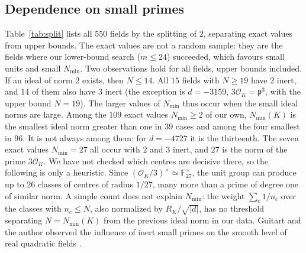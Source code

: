 \documentclass[11pt]{amsart}
\theoremstyle{definition}
\theoremstyle{remark}
\numberwithin{equation}{section}
\newcommand{\cO}{\mathcal{O}}
\newcommand{\Nmin}{N_{\min}}
\begin{document}
\subsection{Dependence on small primes}
Table~\ref{tab:split} lists all $550$ fields by the splitting of $2$, separating exact values
from upper bounds. The exact values are not a random sample: they are the fields where our
lower-bound search ($m\le24$) succeeded, which favours small units and small $\Nmin$. Two
observations hold for all fields, upper bounds included. If an ideal of norm $2$ exists, then
$N\le14$. All $15$ fields with $N\ge19$ have $2$ inert, and $14$ of them also have $3$ inert
(the exception is $d=-3159$, $3\cO_K=\mathfrak p^3$, with the upper bound $N=19$). The
larger values of $\Nmin$ thus occur when the small ideal norms are large. Among the $109$ exact
values $\Nmin\ge2$ of our own, $\Nmin(K)$ is the smallest ideal norm greater than one in $39$
cases and among the four smallest in $96$. It is not always among them: for $d=-4727$ it is the
thirteenth. The seven exact values $\Nmin=27$ all occur with $2$ and $3$ inert, and $27$ is the
norm of the prime $3\cO_K$. We have not checked which centres are decisive there, so the
following is only a heuristic. Since $(\cO_K/3)^\times\simeq\mathbb F_{27}^\times$, the unit group
can produce up to $26$ classes of centres of radius $1/27$, many more than a prime of degree one
of similar norm. A simple count does not explain $\Nmin$: the weight $\sum_{c}1/n_c$ over the
classes with $n_c\le N$, also normalized by $R_K/\sqrt{|d|}$, has no threshold separating
$N=\Nmin(K)$ from the previous ideal norm in our data. Guitart and the author observed the
influence of inert small primes on the smooth level of real quadratic fields
\cite[\S4]{GM}.
\end{document}
